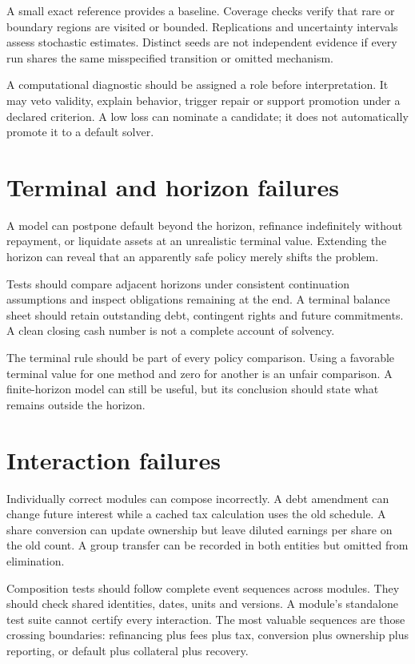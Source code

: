 A small exact reference provides a baseline. Coverage checks verify that rare or boundary regions are visited or bounded. Replications and uncertainty intervals assess stochastic estimates. Distinct seeds are not independent evidence if every run shares the same misspecified transition or omitted mechanism.

A computational diagnostic should be assigned a role before interpretation. It may veto validity, explain behavior, trigger repair or support promotion under a declared criterion. A low loss can nominate a candidate; it does not automatically promote it to a default solver.

\section{Terminal and horizon failures}
A model can postpone default beyond the horizon, refinance indefinitely without repayment, or liquidate assets at an unrealistic terminal value. Extending the horizon can reveal that an apparently safe policy merely shifts the problem.

Tests should compare adjacent horizons under consistent continuation assumptions and inspect obligations remaining at the end. A terminal balance sheet should retain outstanding debt, contingent rights and future commitments. A clean closing cash number is not a complete account of solvency.

The terminal rule should be part of every policy comparison. Using a favorable terminal value for one method and zero for another is an unfair comparison. A finite-horizon model can still be useful, but its conclusion should state what remains outside the horizon.

\section{Interaction failures}
Individually correct modules can compose incorrectly. A debt amendment can change future interest while a cached tax calculation uses the old schedule. A share conversion can update ownership but leave diluted earnings per share on the old count. A group transfer can be recorded in both entities but omitted from elimination.

Composition tests should follow complete event sequences across modules. They should check shared identities, dates, units and versions. A module's standalone test suite cannot certify every interaction. The most valuable sequences are those crossing boundaries: refinancing plus fees plus tax, conversion plus ownership plus reporting, or default plus collateral plus recovery.

